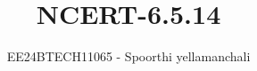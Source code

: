\documentclass[journal]{IEEEtran}
\begin{document}

\vspace{3cm}

\title{NCERT-6.5.14}
\author{EE24BTECH11065 - Spoorthi yellamanchali
}
{\let\newpage\relax\maketitle}

\renewcommand{\thefigure}{\theenumi}
\renewcommand{\thetable}{\theenumi}
\setlength{\intextsep}{10pt} %


\renewcommand{\thetable}{\theenumi}
\end{document}
